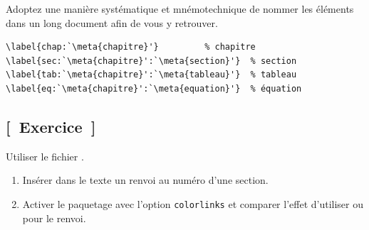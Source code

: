 \begin{conseil}
  Adoptez une manière systématique et mnémotechnique de nommer les
  éléments dans un long document afin de vous y retrouver.

  \bigskip %
\begin{lstlisting}[basicstyle=\normalsize\ttfamily\NoAutoSpacing\color{dark}]
\label{chap:`\meta{chapitre}'}         % chapitre
\label{sec:`\meta{chapitre}':`\meta{section}'}  % section
\label{tab:`\meta{chapitre}':`\meta{tableau}'}  % tableau
\label{eq:`\meta{chapitre}':`\meta{equation}'}  % équation
\end{lstlisting}
\end{conseil}

\subsection{[~Exercice~]}

\begin{exercice}
  Utiliser le fichier .
  \begin{enumerate}
  \item Insérer dans le texte un renvoi au numéro d'une section.
  \item Activer le paquetage  avec l'option
    \texttt{colorlinks} et comparer l'effet d'utiliser  ou
     pour le renvoi.
  \end{enumerate}
\end{exercice}

